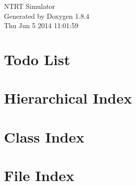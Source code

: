 \documentclass[twoside]{book}
\newcommand{\clearemptydoublepage}{%
  \newpage{\pagestyle{empty}\cleardoublepage}%
}
\begin{document}
\hypersetup{pageanchor=false}
\begin{titlepage}
\vspace*{7cm}
\begin{center}%
{\Large N\-T\-R\-T Simulator }\\
\vspace*{1cm}
{\large Generated by Doxygen 1.8.4}\\
\vspace*{0.5cm}
{\small Thu Jun 5 2014 11:01:59}\\
\end{center}
\end{titlepage}
\clearemptydoublepage
\tableofcontents
\clearemptydoublepage
{}
\hypersetup{pageanchor=true}

\chapter{Todo List}
\label{todo}
\hypertarget{todo}{}

\chapter{Hierarchical Index}

\chapter{Class Index}

\chapter{File Index}

\end{document}
